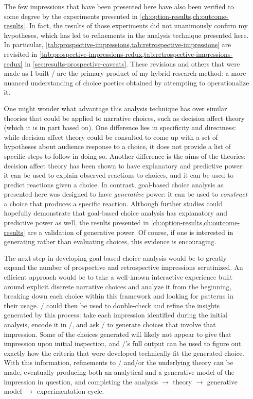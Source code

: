 The few impressions that have been presented here have also been verified to some degree by the experiments presented in \cref{ch:option-results,ch:outcome-results}.
%
In fact, the results of those experiments did not unanimously confirm my hypotheses, which has led to refinements in the analysis technique presented here.
%
In particular, \cref{tab:prospective-impressions,tab:retrospective-impressions} are revisited in \cref{tab:prospective-impressions-redux,tab:retrospective-impressions-redux} in \cref{sec:results-prospective-caveats}.
%
These revisions and others that were made as I built \dunyazad/ are the primary product of my hybrid research method: a more nuanced understanding of choice poetics obtained by attempting to operationalize it.


One might wonder what advantage this analysis technique has over similar theories that could be applied to narrative choices, such as decision affect theory \citep{Mellers1997} (which it is in part based on).
%
One difference lies in specificity and directness: while decision affect theory could be consulted to come up with a set of hypotheses about audience response to a choice, it does not provide a list of specific steps to follow in doing so.
%
Another difference is the aims of the theories: decision affect theory has been shown to have explanatory and predictive power: it can be used to explain observed reactions to choices, and it can be used to predict reactions given a choice.
%
In contrast, goal-based choice analysis as presented here was designed to have \emph{generative} power: it can be used to \emph{construct} a choice that produces a specific reaction.
%
Although further studies could hopefully demonstrate that goal-based choice analysis has explanatory and predictive power as well, the results presented in \cref{ch:option-results,ch:outcome-results} are a validation of generative power.
%
Of course, if one is interested in generating rather than evaluating choices, this evidence is encouraging.


The next step in developing goal-based choice analysis would be to greatly expand the number of prospective and retrospective impressions scrutinized.
%
An efficient approach would be to take a well-known interactive experience built around explicit discrete narrative choices and analyze it from the beginning, breaking down each choice within this framework and looking for patterns in their usage.
%
\dunyazad/ could then be used to double-check and refine the insights generated by this process: take each impression identified during the initial analysis, encode it in \dunyazad/, and ask \dunyazad/ to generate choices that involve that impression.
%
Some of the choices generated will likely not appear to give that impression upon initial inspection, and \dunyazad/'s full output can be used to figure out exactly how the criteria that were developed technically fit the generated choice.
%
With this information, refinements to \dunyazad/ and/or the underlying theory can be made, eventually producing both an analytical and a generative model of the impression in question, and completing the analysis $\rightarrow$ theory $\rightarrow$ generative model $\rightarrow$ experimentation cycle.


